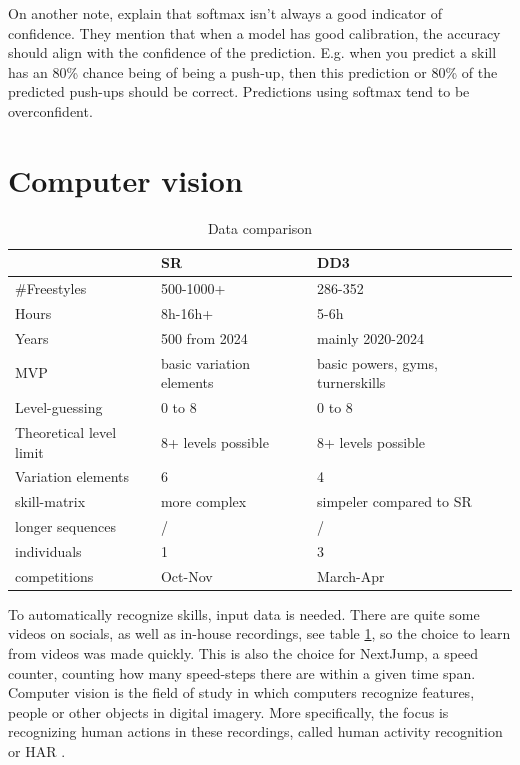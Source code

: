On another note, \textcite{Guo_2017} explain that softmax isn't always a good indicator of confidence. They mention that when a model has good calibration, the accuracy should align with the confidence of the prediction. E.g. when you predict a skill has an 80\% chance being of being a push-up, then this prediction or 80\% of the predicted push-ups should be correct. Predictions using softmax tend to be overconfident.



\section{Computer vision}
\label{subsec:bp-literature-computer-vision}

\begin{table}[t]
    \centering
    \begin{tabular}{|l|l|l|}
        \hline
        & SR & DD3 \\ \hline
        \#Freestyles & 500-1000+ & 286-352 \\ \hline
        Hours & 8h-16h+ & 5-6h \\ \hline
        Years & 500 from 2024 & mainly 2020-2024 \\ \hline
        MVP & basic variation elements & basic powers, gyms, turnerskills \\ \hline
        Level-guessing & 0 to 8 & 0 to 8 \\ \hline
        Theoretical level limit & 8+ levels possible & 8+ levels possible \\ \hline
        Variation elements & 6 & 4 \\ \hline
        skill-matrix & more complex & simpeler compared to SR \\ \hline
        longer sequences & / & / \\ \hline
        individuals & 1 & 3 \\ \hline
        competitions & Oct-Nov & March-Apr \\ \hline
    \end{tabular}
    \caption{Data comparison}
    \label{tbl:data-comparison-sr-dd}
\end{table}

To automatically recognize skills, input data is needed. There are quite some videos on socials, as well as in-house recordings, see table \ref{tbl:data-comparison-sr-dd}, so the choice to learn from videos was made quickly. This is also the choice for NextJump, a speed counter, counting how many speed-steps there are within a given time span.
Computer vision is the field of study in which computers recognize features, people or other objects in digital imagery. More specifically, the focus is recognizing human actions in these recordings, called human activity recognition or HAR \autocite{Pareek_2020}.

